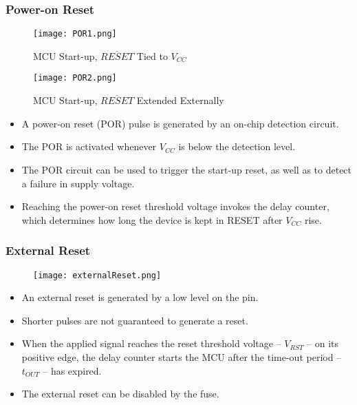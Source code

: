 \documentclass{article}
\begin{document}
\subsubsection{Power-on Reset}
\begin{figure}[H]
    \begin{minipage}{0.45\textwidth}
        \begin{center}
            \texttt{[image: POR1.png]}
            \caption*{MCU Start-up, $\overline{RESET}$ Tied to $V_{CC}$}
        \end{center}
    \end{minipage}
    \begin{minipage}{0.5\textwidth}
        \begin{center}
            \texttt{[image: POR2.png]}
            \caption*{MCU Start-up, $\overline{RESET}$ Extended Externally}
        \end{center}
    \end{minipage}
\end{figure}
\begin{itemize}
    \item A power-on reset (POR) pulse is generated by an on-chip detection circuit.
    \item The POR is activated whenever $V_{CC}$ is below the detection level.
    \item The POR circuit can be used to trigger the start-up reset, as well as to detect a failure in supply voltage.
    \item Reaching the power-on reset threshold voltage invokes the delay counter, which determines how long the device is kept in RESET after $V_{CC}$ rise.
\end{itemize}


\subsubsection{External Reset}
\begin{figure}[H]
    \begin{center}
        \texttt{[image: externalReset.png]}
    \end{center}
\end{figure}
\begin{itemize}
    \item An external reset is generated by a low level on the   pin.
    \item Shorter pulses are not guaranteed to generate a reset.
    \item When the applied signal reaches the reset threshold voltage – $V_{RST}$ – on its positive edge, the delay counter starts the MCU after the time-out period – $t_{OUT}$ – has expired.
    \item The external reset can be disabled by the  fuse.
\end{itemize}
\end{document}
